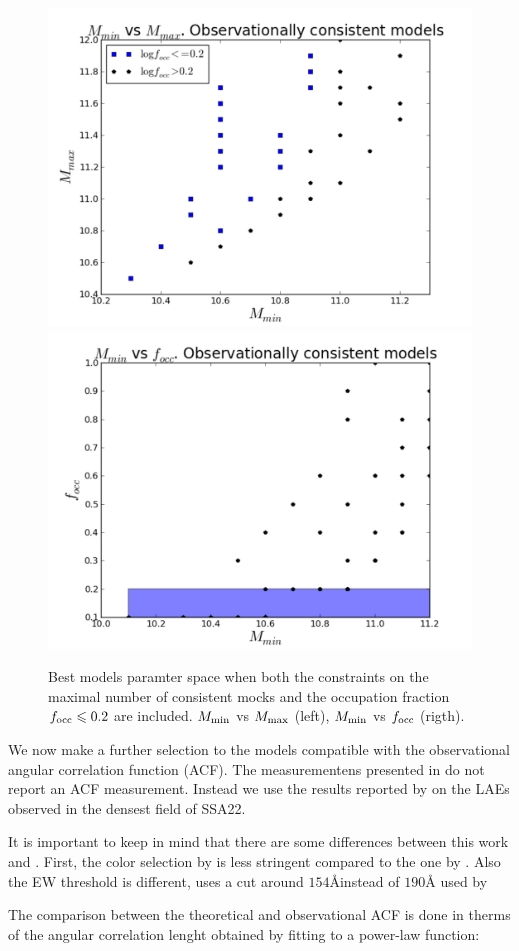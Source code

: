 \documentclass[usenatbib]{mn2e}
\begin{document}
\begin{figure}
\begin{center}
\includegraphics[width=0.46\linewidth,angle=0]{./plots/mmin_vs_mmax.pdf}
\hspace{5mm}
\includegraphics[width=0.46\linewidth,angle=0]{./plots/mmin_vs_focc.pdf}
\end{center}
\caption{Best models paramter space when both the constraints on the
  maximal number of  consistent mocks and the occupation  fraction
  $f_{\rm occ}\leq  0.2$ are included. $M_{\rm min}$ vs $M_{\rm max}$
  (left), $M_{\rm min}$ vs $f_{\rm occ}$ (rigth).
  \label{fig:restriction_mock_and_f_occ_corr}} 
\end{figure} 

We now make a further selection to the models compatible with the
observational angular correlation function (ACF). The measurementens
presented in \citep{Yamada2012} do not report an ACF
measurement. Instead we use the results reported by
\citep{Hayashino2004} on the LAEs observed in the densest field of
SSA22.     
   
It is important to keep in mind that there are some differences
between this work and \citep{Yamada2012}. First, the color selection by
\cite{Yamada2012} is less stringent compared to the one by
\cite{Hayashino2004}. Also the EW threshold is different,
\cite{Hayashino2004} uses a cut around $154$\AA instead of $190$\AA
used by \citep{Yamada2012}

The comparison between the theoretical and observational ACF is done in
therms of the angular correlation lenght obtained  by fitting to a power-law
function:  
\end{document}
